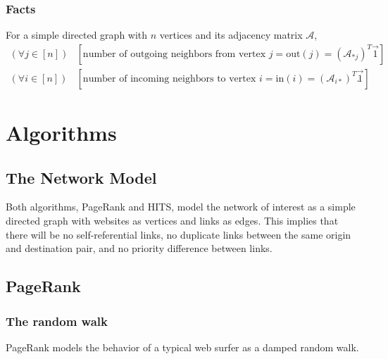 \documentclass[12pt, titlepage, twoside]{amsart}
\begin{document}
\subsubsection{Facts}

For a simple directed graph with $n$ vertices and its adjacency matrix $\mathcal{A}$,
\begin{align*}
  (\forall j\in[n])&
  \left[\text{number of outgoing neighbors from vertex $j$} = \mathrm{out}(j) = (\mathcal{A}_{*j})^T\vec{1}\right] \\
  (\forall i\in[n])&
  \left[\text{number of incoming neighbors to vertex $i$} = \mathrm{in}(i) = (\mathcal{A}_{i*})^T\vec{1}\right].
\end{align*}

\section{Algorithms}

\subsection{The Network Model}

Both algorithms, PageRank and HITS, model the network of interest as a simple directed graph with websites as vertices
and links as edges.
This implies that there will be no self-referential links, no duplicate links between the same origin
and destination pair, and no priority difference between links.

\subsection{PageRank}

\subsubsection{The random walk}

PageRank models the behavior of a typical web surfer as a damped random walk.
\end{document}
